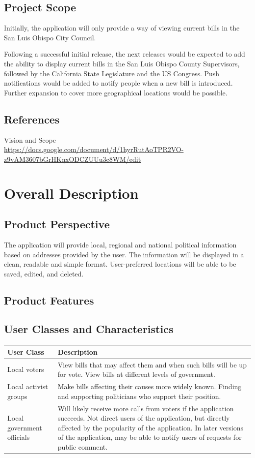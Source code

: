 \documentclass[12pt,oneside,letterpaper]{article}
\newcounter{use_case}
\begin{document}
\subsection{Project Scope}
Initially, the application will only provide a way of viewing current
bills in the San Luis Obispo City Council.

Following a successful initial release, the next releases would be
expected to add the ability to display current bills in the San Luis
Obispo County Supervisors, followed by the California State
Legislature and the US Congress. Push notifications would be added to
notify people when a new bill is introduced. Further expansion to
cover more geographical locations would be possible.

\subsection{References}
\begin{compactenum}
\item Vision and Scope\\
  \url{https://docs.google.com/document/d/1hyrRutAoTPR2VO-z9vAM3607bGrHKqxODCZUUu3c8WM/edit}
\end{compactenum}

\section{Overall Description}
\subsection{Product Perspective}
The application will provide local, regional and national political
information based on addresses provided by the user. The information
will be displayed in a clean, readable and simple format.
User-preferred locations will be able to be saved, edited, and deleted.

\subsection{Product Features}
\subsection{User Classes and Characteristics}
\begin{longtabu}{|l|X|}
  \hline
  \textbf{User Class}&\textbf{Description}\\
  \hline
  Local voters & View bills that may affect them and when such bills will be up for vote. View bills at different levels of government.\\
  \hline
  Local activist groups & Make bills affecting their causes more widely known. Finding and supporting politicians who support their position.\\
  \hline
  Local government officials & Will likely receive more calls from voters if the application succeeds. Not direct users of the application, but directly affected by the popularity of the application. In later versions of the application, may be able to notify users of requests for public comment.\\
  \hline
\end{longtabu}
\end{document}
